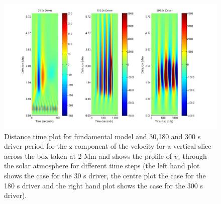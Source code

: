 \documentclass[authoryear,final,1p]{elsarticle}
\begin{document}

\begin{figure}[h]
\includegraphics[scale=0.4]{images/fig4_dt_30_180_300_0_vert_2Mm.jpg}
\caption{Distance time plot for fundamental model and 30,180 and 300 s driver period for the z component of the velocity for a vertical slice across the box  taken at 2 Mm and shows  the profile of $v_{z}$ through the solar atmosphere for different time steps (the left hand plot shows the case for the 30 s driver, the centre plot the case for the 180 s driver and the right hand plot shows the case for the 300 s  driver). }
\label{Fig3}
\end{figure}


\end{document}
